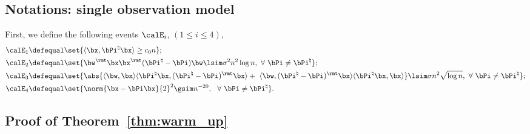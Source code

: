 \documentclass[11pt]{article}
\def \bPitrue {\bPi^{\natural}}
\begin{document}
\subsection{Notations: single observation model}
First, we define the following events $\calE_i$, $(1\leq i \leq 4)$,
\begin{align*}
\calE_{1} \defequal & \set{
\langle \bx, \bPitrue\bx \rangle \geq c_0 n };
\\
\calE_2 \defequal &
\set{
\bw^{\rmt}\bx\bx^{\rmt}(\bPitrue - \bPi ) \bw \lsim \sigma^2 n^2\log n,~\forall~\bPi \neq \bPitrue}; \\
\calE_3 \defequal &
\set{
\abs{\langle \bw, \bx\rangle  \langle \bPitrue \bx, (\bPitrue - \bPi)^{\rmt}\bx\rangle   + \
\langle \bw, (\bPitrue - \bPi)^{\rmt}\bx\rangle
\langle \bPitrue \bx, \bx \rangle
}\lsim \sigma n^2 \sqrt{\log n},~\forall~\bPi \neq \bPitrue
};\\
\calE_{4}\defequal &
\set{
\norm{\bx - \bPi\bx}{2}^2 \gsim n^{-20},~~\forall~\bPi\neq \bPitrue}.
\end{align*}

\subsection{Proof of Theorem~\ref{thm:warm_up}}
\label{subsec:appendix_proof_thm_warm_up}
\end{document}
